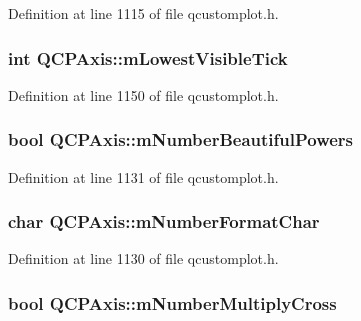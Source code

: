 Definition at line 1115 of file qcustomplot.\-h.

\hypertarget{class_q_c_p_axis_aebb24ba8734b7e054efc6e1ecc5414c7}{
\subsubsection[{m\-Lowest\-Visible\-Tick}]{\setlength{\rightskip}{0pt plus 5cm}int Q\-C\-P\-Axis\-::m\-Lowest\-Visible\-Tick\hspace{0.3cm}{\ttfamily [protected]}}}\label{class_q_c_p_axis_aebb24ba8734b7e054efc6e1ecc5414c7}


Definition at line 1150 of file qcustomplot.\-h.

\hypertarget{class_q_c_p_axis_af03809bee3f3e35fcc38d25b6dd5003b}{
\subsubsection[{m\-Number\-Beautiful\-Powers}]{\setlength{\rightskip}{0pt plus 5cm}bool Q\-C\-P\-Axis\-::m\-Number\-Beautiful\-Powers\hspace{0.3cm}{\ttfamily [protected]}}}\label{class_q_c_p_axis_af03809bee3f3e35fcc38d25b6dd5003b}


Definition at line 1131 of file qcustomplot.\-h.

\hypertarget{class_q_c_p_axis_a600d56365316ea783927f7d595f1ed54}{
\subsubsection[{m\-Number\-Format\-Char}]{\setlength{\rightskip}{0pt plus 5cm}char Q\-C\-P\-Axis\-::m\-Number\-Format\-Char\hspace{0.3cm}{\ttfamily [protected]}}}\label{class_q_c_p_axis_a600d56365316ea783927f7d595f1ed54}


Definition at line 1130 of file qcustomplot.\-h.

\hypertarget{class_q_c_p_axis_aebf0367d8645d2e05b93a0952b7e805b}{
\subsubsection[{m\-Number\-Multiply\-Cross}]{\setlength{\rightskip}{0pt plus 5cm}bool Q\-C\-P\-Axis\-::m\-Number\-Multiply\-Cross\hspace{0.3cm}{\ttfamily [protected]}}}\label{class_q_c_p_axis_aebf0367d8645d2e05b93a0952b7e805b}


